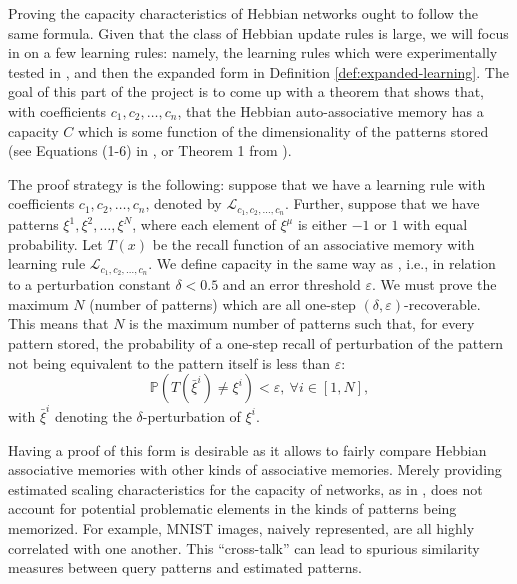 \documentclass{article}
\theoremstyle{definition}
\begin{document}
Proving the capacity characteristics of Hebbian networks ought to
follow the same formula. Given that the class of Hebbian update rules
is large, we will focus in on a few learning rules: namely,
the learning rules which were experimentally tested in
\textcite{lansner_benchmarking_2025}, and then the expanded
form in Definition \ref{def:expanded-learning}. The goal of this
part of the project is to come up with a theorem that shows that,
with coefficients $c_1, c_2, \dots, c_n$, that the Hebbian
auto-associative memory has a capacity $C$ which is some
function of the dimensionality of the patterns stored
(see Equations (1-6) in \textcite{lansner_benchmarking_2025}, or
Theorem 1 from \textcite{bao_capacity_2022}).

The proof strategy is the following: suppose
that we have a learning rule with coefficients $c_1, c_2, \dots, c_n$,
denoted by $\mathcal{L}_{c_1, c_2, \dots, c_n}$. Further, suppose
that we have patterns $\xi^1, \xi^2, \dots, \xi^N$, where
each element of $\xi^\mu$ is either $-1$ or $1$ with equal probability.
Let $T(x)$ be the recall function of an associative memory with learning
rule $\mathcal{L}_{c_1, c_2, \dots, c_n}$. We define capacity in
the same way as \textcite{bao_capacity_2022}, i.e., in relation
to a perturbation constant $\delta < 0.5$ and an error threshold $\varepsilon$.
We must prove the maximum $N$ (number of patterns) which are
all one-step $(\delta, \varepsilon)$-recoverable. This means that
$N$ is the maximum number of patterns such that, for every pattern stored,
the probability of a one-step recall of perturbation of the pattern
not being equivalent to the pattern itself is less than $\varepsilon$:
\begin{equation}
  \mathbb{P}(T(\bar \xi^i) \neq \xi^i) < \varepsilon, ~\forall i \in [1, N],
\end{equation}
with $\bar \xi^i$ denoting the $\delta$-perturbation of $\xi^i$.

Having a proof of this form is desirable as it allows to fairly compare
Hebbian associative memories with other kinds of associative memories.
Merely providing estimated scaling characteristics for
the capacity of networks, as in \textcite{lansner_benchmarking_2025}, does
not account for potential problematic elements in the kinds of patterns
being memorized. For example, MNIST \parencite{lecun_mnist_2010}
images, naively represented, are all highly correlated with one another.
This ``cross-talk'' \parencite{kohonen_correlation_1988} can lead
to spurious similarity measures between query patterns and estimated
patterns.
\end{document}
